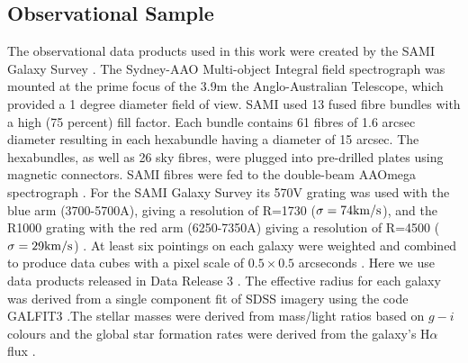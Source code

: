 \documentclass[a4paper,fleqn,usenatbib]{mnras}
\begin{document}
\subsection{Observational Sample}

The observational data products used in this work were created by the SAMI Galaxy Survey \citep{2015MNRAS.447.2857B}. The Sydney-AAO Multi-object Integral field spectrograph \citep[SAMI;][]{2012MNRAS.421..872C} was mounted at the prime focus of the 3.9m the Anglo-Australian Telescope, which provided a 1 degree diameter field of view. SAMI used 13 fused fibre bundles \citep[hexabundles;][]{2011OExpr..19.2649B, 2014MNRAS.438..869B} with a high (75 percent) fill factor. Each bundle contains 61 fibres of 1.6 arcsec diameter resulting in each hexabundle having a diameter of 15 arcsec. The hexabundles, as well as 26 sky fibres, were plugged into pre-drilled plates using magnetic connectors. SAMI fibres were fed to the double-beam AAOmega spectrograph \citep{2006SPIE.6269E..0GS}. For the SAMI Galaxy Survey its 570V grating was used with the blue arm (3700-5700A), giving a resolution of R=1730 (${\rm \sigma=74 km/s}$), and the R1000 grating with the red arm (6250-7350A) giving a resolution of R=4500 (${\rm \sigma=29 km/s}$) \citep{2017ApJ...835..104V}. At least six pointings on each galaxy were weighted and combined to produce data cubes with a pixel scale of $0.5\times0.5$ arcseconds \citep{2015MNRAS.446.1567A, 2015MNRAS.446.1551S}. Here we use data products released in Data Release 3 \citep{2021MNRAS.505..991C}. The effective radius for each galaxy was derived from a single component fit of SDSS imagery using the code GALFIT3 \citep{2010AJ....139.2097P, 2011MNRAS.413..971D}.The stellar masses were derived from mass/light ratios based on $g-i$ colours \citep{2015MNRAS.447.2857B} and the global star formation rates were derived from the galaxy's H$\alpha$ flux \citep{2018MNRAS.475.5194M}.
\end{document}
